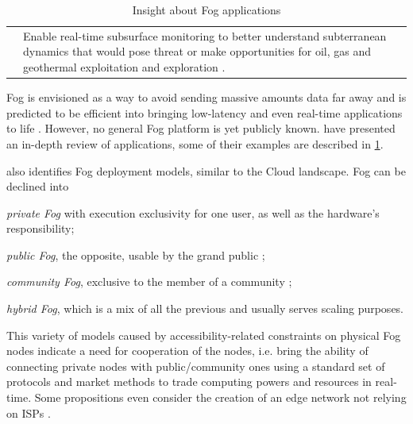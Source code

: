 \documentclass[11pt]{sdm}
\begin{document}
\begin{table}[t]
\begin{tabular}{@{} p{3cm}|p{12cm} @{}}
		                & Enable real-time subsurface monitoring to better understand subterranean dynamics that would pose threat or make opportunities for oil, gas and geothermal exploitation and exploration \cite{openfog_consortium_real-time_2018}.
		\\
		\cmidrule[1pt]{1-2}
	\end{tabular}
	\caption{\label{tab:applications}Insight about Fog applications \cite{ahmed_fog_2019}}
\end{table}

Fog is envisioned as a way to avoid sending massive amounts data far away and is predicted to be efficient into bringing low-latency and even real-time applications to life \cite{ahmed_fog_2019}. However, no general Fog platform is yet publicly known. \citet{ahmed_fog_2019} have presented an in-depth review of applications, some of their examples are described in \ref{tab:applications}.

\citet{ahmed_fog_2019} also identifies Fog deployment models, similar to the Cloud landscape. Fog can be declined into
\begin{enumerate*}[(a)]
	\item \emph{private Fog} with execution exclusivity for one user, as well as the hardware's responsibility;
	\item \emph{public Fog}, the opposite, usable by the grand public ;
	\item \emph{community Fog}, exclusive to the member of a community ;
	\item \emph{hybrid Fog}, which is a mix of all the previous and usually serves scaling purposes.
\end{enumerate*}
This variety of models caused by accessibility-related constraints on physical Fog nodes indicate a need for cooperation of the nodes, i.e. bring the ability of connecting private nodes with public/community ones using a standard set of protocols and market methods to trade computing powers and resources in real-time. Some propositions even consider the creation of an edge network not relying on \glspl{ISP} \cite{bermbach_towards_2021}.
\end{document}
